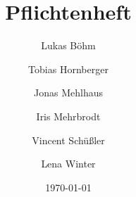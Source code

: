 \documentclass{scrartcl}
\begin{document}
\title{Pflichtenheft}
\author{
	Lukas Böhm\and
	Tobias Hornberger\and
	Jonas Mehlhaus\and
	Iris Mehrbrodt\and
	Vincent Schüßler \and	
	Lena Winter	
}
\date{\today}
\maketitle

\tableofcontents \newpage

 \newpage
  \newpage
 \newpage
 \newpage
 \newpage
 \newpage
 \newpage
 \newpage

\end{document}

